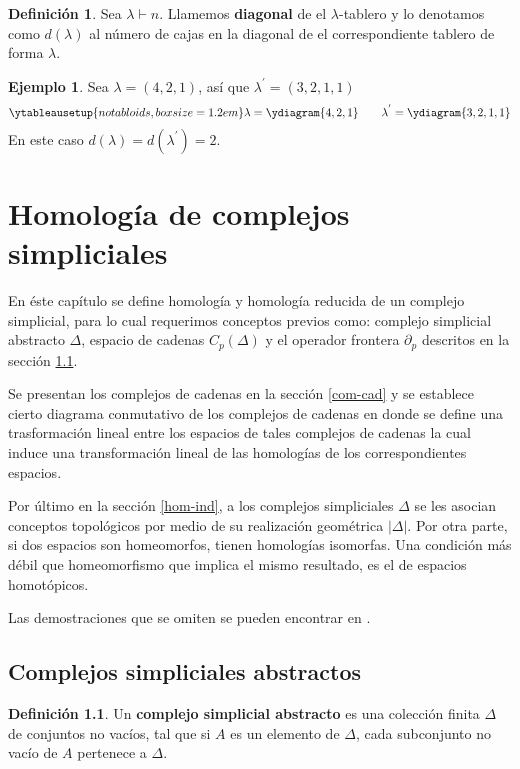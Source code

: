 \documentclass[12pt]{book}
\theoremstyle{definition}
\newtheorem{definition}[theorem]{Definición}
\newtheorem{example}[theorem]{Ejemplo}
\newcounter{in}
\newcounter{ini}
\begin{document}
\begin{definition}
  Sea $\lambda\vdash n$. Llamemos \textbf{diagonal} de el
  $\lambda$-tablero y lo denotamos como $d(\lambda)$ al número de
  cajas en la diagonal de el correspondiente tablero de forma $\lambda$.
\end{definition}

\begin{example}
  Sea $\lambda=(4,2,1)$, así que $\lambda^{'}=(3,2,1,1)$
  \begin{equation*}
    \ytableausetup{notabloids,boxsize=1.2em} 
    \lambda=\ydiagram{4,2,1} \qquad
    \lambda^{'}=\ydiagram{3,2,1,1}
  \end{equation*}
  En este caso $d(\lambda)=d(\lambda^{'})=2$.
\end{example}

\chapter{Homología de complejos simpliciales}
\label{cha:hom-com-sim}

En éste capítulo se define homología  y homología reducida de un
complejo simplicial, para lo cual requerimos conceptos previos como:
complejo simplicial abstracto $\Delta$, espacio de cadenas $C_{p}(\Delta)$ y el
operador frontera $\partial_{p}$ descritos en la sección
\ref{com-sim-abs}. 

Se presentan los complejos de cadenas en la sección \ref{com-cad} y se
establece cierto diagrama conmutativo de los complejos de cadenas en donde
se define una trasformación lineal entre los espacios de tales
complejos de cadenas la cual induce una transformación lineal de las homologías
de los correspondientes espacios.

Por último en la sección \ref{hom-ind}, a los complejos simpliciales
$\Delta$ se les asocian conceptos topológicos por medio de su
realización geométrica $|\Delta|$. Por otra parte, si dos espacios son
homeomorfos, tienen homologías isomorfas. Una condición más débil que
homeomorfismo que implica el mismo resultado, es el de espacios
homotópicos.

Las demostraciones que se omiten se pueden encontrar en
\cite{munkres1984elements}.

\section{Complejos simpliciales abstractos}
\label{com-sim-abs}

\begin{definition}
Un \textbf{complejo simplicial abstracto} es una colección finita
$\Delta$ de conjuntos no vacíos, tal que si $A$ es un elemento de $\Delta$,
cada subconjunto no vacío de $A$ pertenece a $\Delta$.
\end{definition}
\end{document}

